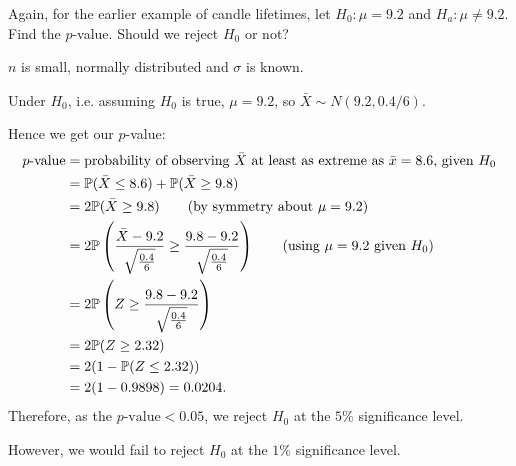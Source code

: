 \documentclass[10pt, a4paper]{article}
\begin{document}
\begin{example}
    Again,
    for the earlier example of candle lifetimes,
    let $H_0 : \mu = 9.2$ and $H_a : \mu \neq 9.2$.
    Find the $p$-value.
    Should we reject $H_0$ or not?

    \begin{solution}
        $n$ is small,
        normally distributed and $\sigma$ is known.

        Under $H_0$,
        i.e. assuming $H_0$ is true,
        $\mu = 9.2$,
        so $\bar{X} \sim N(9.2, 0.4 / 6)$.

        Hence we get our $p$-value:
        \begin{align*}
            p\text{-value} &= \text{probability of observing $\bar{X}$ at least as extreme as $\bar{x} = 8.6$,
            given $H_0$} \\
            &= \P(\bar{X} \leq 8.6) + \P(\bar{X} \geq 9.8) \\
            &= 2\P(\bar{X} \geq 9.8)\qquad (\text{by symmetry about } \mu = 9.2) \\
            &= 2\P\left(\frac{\bar{X} - 9.2}{\sqrt{\frac{0.4}{6}}}\geq \frac{9.8 - 9.2}{\sqrt{\frac{0.4}{6}}}\right)\qquad (\text{using $\mu = 9.2$ given $H_0$}) \\
            &= 2\P\left(Z \geq \frac{9.8 - 9.2}{\sqrt{\frac{0.4}{6}}}\right) \\
            &= 2\P(Z \geq 2.32) \\
            &= 2(1 - \P(Z \leq 2.32)) \\
            &= 2(1 - 0.9898) = 0.0204.
        \end{align*}
        Therefore,
        as the $p\text{-value} < 0.05$,
        we reject $H_0$ at the $5\%$ significance level.

        However,
        we would fail to reject $H_0$ at the $1\%$ significance level.
    \end{solution}
\end{example}
\end{document}
